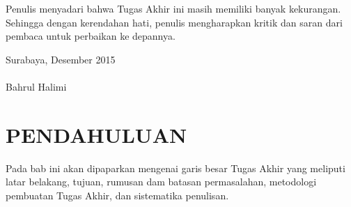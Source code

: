 \documentclass{ta-its}
\begin{document}
        Penulis menyadari bahwa Tugas Akhir ini masih memiliki banyak kekurangan. Sehingga dengan kerendahan hati, penulis mengharapkan kritik dan saran dari pembaca untuk perbaikan ke depannya.
        
        \hfill Surabaya, Desember 2015 \\ \\
        
        
        \hfill Bahrul Halimi

        \cleardoublepage %

    \tableofcontents %
    \listoftables %
    \listoffigures %
    \lstlistoflistings %

\mainmatter %
    \chapter{PENDAHULUAN}
        Pada bab ini akan dipaparkan mengenai garis besar Tugas Akhir yang meliputi latar belakang, tujuan, rumusan dam batasan permasalahan, metodologi pembuatan Tugas Akhir, dan sistematika penulisan.
\end{document}
